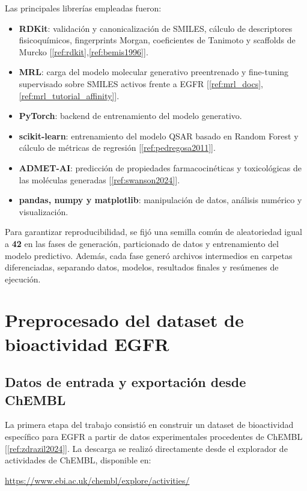 \documentclass[IB]{TFUOC}%
\begin{document}
Las principales librerías empleadas fueron:

\begin{itemize}
    \item \textbf{RDKit}: validación y canonicalización de SMILES, cálculo de descriptores fisicoquímicos, fingerprints Morgan, coeficientes de Tanimoto y scaffolds de Murcko [\ref{ref:rdkit},\ref{ref:bemis1996}].
    \item \textbf{MRL}: carga del modelo molecular generativo preentrenado y fine-tuning supervisado sobre SMILES activos frente a EGFR [\ref{ref:mrl_docs},\ref{ref:mrl_tutorial_affinity}].
    \item \textbf{PyTorch}: backend de entrenamiento del modelo generativo.
    \item \textbf{scikit-learn}: entrenamiento del modelo QSAR basado en Random Forest y cálculo de métricas de regresión [\ref{ref:pedregosa2011}].
    \item \textbf{ADMET-AI}: predicción de propiedades farmacocinéticas y toxicológicas de las moléculas generadas [\ref{ref:swanson2024}].
    \item \textbf{pandas, numpy y matplotlib}: manipulación de datos, análisis numérico y visualización.
\end{itemize}

Para garantizar reproducibilidad, se fijó una semilla común de aleatoriedad igual a \textbf{42} en las fases de generación, particionado de datos y entrenamiento del modelo predictivo. Además, cada fase generó archivos intermedios en carpetas diferenciadas, separando datos, modelos, resultados finales y resúmenes de ejecución.

\section{Preprocesado del dataset de bioactividad EGFR}

\subsection{Datos de entrada y exportación desde ChEMBL}

La primera etapa del trabajo consistió en construir un dataset de bioactividad específico para EGFR a partir de datos experimentales procedentes de ChEMBL [\ref{ref:zdrazil2024}]. La descarga se realizó directamente desde el explorador de actividades de ChEMBL, disponible en:

\vspace{0.1cm}
\begin{center}
\url{https://www.ebi.ac.uk/chembl/explore/activities/}
\end{center}
\vspace{0.1cm}
\end{document}
